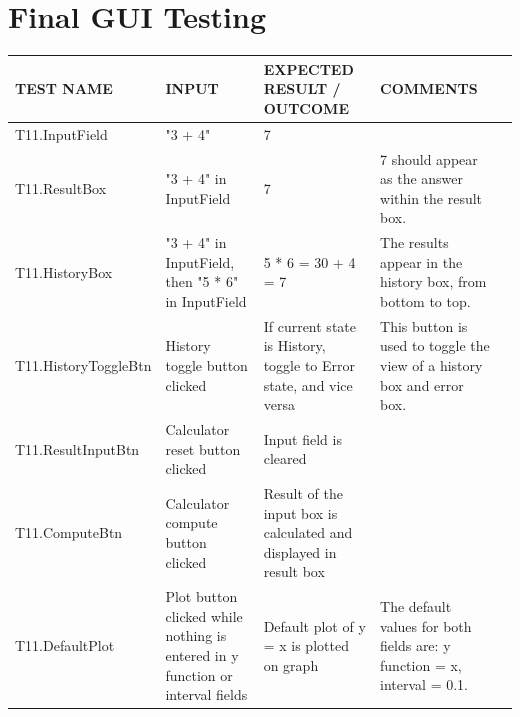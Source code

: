 \documentclass[a4paper, oneside, 11pt]{report}
\begin{document}
    \section{Final GUI Testing}
    \label{FinalGUITest}
    \begin{tabular}{|p{1.5in}|p{1.5in}|p{1.6in}|p{1.6in}|p{2.4in}|}
        \hline
        TEST NAME       & INPUT                     & EXPECTED RESULT / OUTCOME              & COMMENTS                                \\
        \hline
        T11.InputField        & "3 + 4"                   & 7                                      &                                         \\
        \hline
        T11.ResultBox         & "3 + 4" in InputField                   & 7                                      & 7 should appear as the answer within the result box.                                        \\
        \hline
        T11.HistoryBox         & "3 + 4" in InputField, then "5 * 6" in InputField                   & 5 * 6 = 30\newline 3 + 4 = 7                                      & The results appear in the history box, from bottom to top.                                        \\
        \hline
        T11.HistoryToggleBtn        & History toggle button clicked                  & If current state is History, toggle to Error state, and vice versa                                      & This button is used to toggle the view of a history box and error box.                                         \\
        \hline
        T11.ResultInputBtn        & Calculator reset button clicked                   & Input field is cleared                           &                                         \\
        \hline
        T11.ComputeBtn        & Calculator compute button clicked                  & Result of the input box is calculated and displayed in result box                           &                                         \\
        \hline
        T11.DefaultPlot         & Plot button clicked while nothing is entered in y function or interval fields                   & Default plot of y = x is plotted on graph                                      & The default values for both fields are: y function = x, interval = 0.1.                                        \\

\end{tabular}
\end{document}
